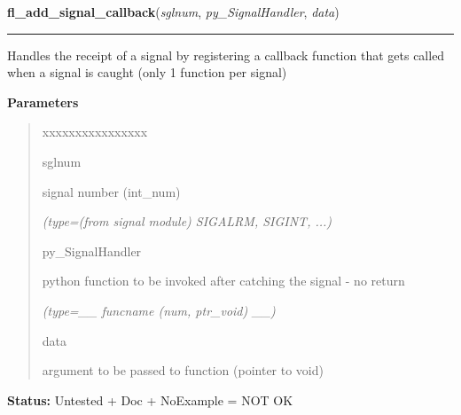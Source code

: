 \hspace{.8\funcindent}\begin{boxedminipage}{\funcwidth}

    \raggedright \textbf{fl\_add\_signal\_callback}(\textit{sglnum}, \textit{py\_SignalHandler}, \textit{data})

    \vspace{-1.5ex}

    \rule{\textwidth}{0.5\fboxrule}
\setlength{\parskip}{2ex}
    Handles the receipt of a signal by registering a callback function that
    gets called when a signal is caught (only 1 function per signal)

\setlength{\parskip}{1ex}
      \textbf{Parameters}
      \vspace{-1ex}

      \begin{quote}
        \begin{Ventry}{xxxxxxxxxxxxxxxx}

          \item[sglnum]

          signal number (int\_num)

            {\it (type=(from signal module) SIGALRM, SIGINT, ...)}

          \item[py\_SignalHandler]

          python function to be invoked after catching the signal - no 
          return

            {\it (type=\_\_ funcname (num, ptr\_void) \_\_)}

          \item[data]

          argument to be passed to function (pointer to void)

        \end{Ventry}

      \end{quote}

\textbf{Status:} Untested + Doc + NoExample = NOT OK



    \end{boxedminipage}

    \label{xformslib:library:fl_remove_signal_callback}

    \vspace{0.5ex}

